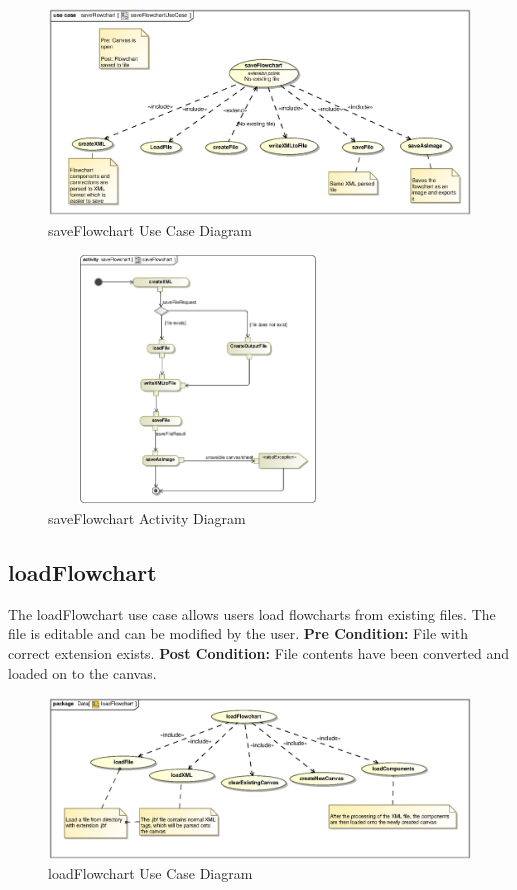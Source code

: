 \documentclass[11pt,a4paper,titlepage]{article}
\begin{document}
\begin{figure}[H]
  \centering
\includegraphics[width=500px]{saveFlowchartUseCase.eps}
\caption{saveFlowchart Use Case Diagram}
\end{figure}

\begin{figure}[H]
  \centering
\includegraphics[height=250px, width=300px]{saveFlowchart.eps}
\caption{saveFlowchart Activity Diagram}
\end{figure}

\newpage
\subsection{loadFlowchart}
The loadFlowchart use case allows users load flowcharts from existing files. The file is editable and can be modified by the user.\newline\newline
\textbf{Pre Condition:} File with correct extension exists.\newline\newline
\textbf{Post Condition:} File contents have been converted and loaded on to the canvas.

\begin{figure}[H]
  \centering
\includegraphics[width=500px]{loadFlowchart.eps}
\caption{loadFlowchart Use Case Diagram}
\end{figure}
\end{document}
